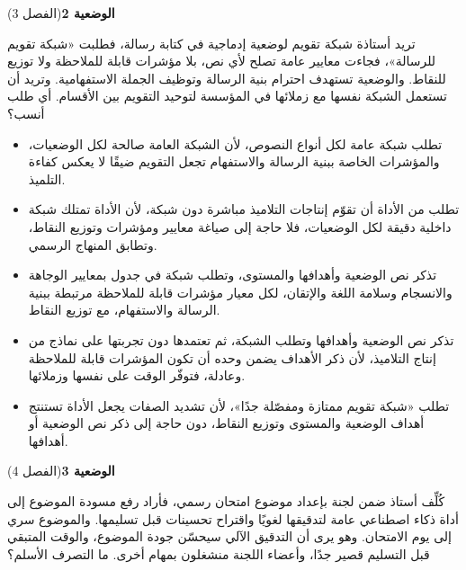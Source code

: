 \documentclass[11pt,a4paper]{article}
\begin{document}
\par\vspace{6pt}
\noindent
{\large\khatt\textbf{الوضعية 2}}\hfill{\small(الفصل 3)}\par\nopagebreak\vspace{3pt}
\setlength{\fboxsep}{7pt}\colorbox{gray!10}{\parbox{\dimexpr\linewidth-14pt}{تريد أستاذة شبكة تقويم لوضعية إدماجية في كتابة رسالة، فطلبت «شبكة تقويم للرسالة»، فجاءت معايير عامة تصلح لأي نص، بلا مؤشرات قابلة للملاحظة ولا توزيع للنقاط. والوضعية تستهدف احترام بنية الرسالة وتوظيف الجملة الاستفهامية. وتريد أن تستعمل الشبكة نفسها مع زملائها في المؤسسة لتوحيد التقويم بين الأقسام. أي طلب أنسب؟}}\par\nopagebreak
\begin{itemize}[leftmargin=1.0cm, labelsep=6pt, itemsep=3pt, topsep=4pt, parsep=0pt]
  \item[\textbf{أ)}] تطلب شبكة عامة لكل أنواع النصوص، لأن الشبكة العامة صالحة لكل الوضعيات، والمؤشرات الخاصة ببنية الرسالة والاستفهام تجعل التقويم ضيقًا لا يعكس كفاءة التلميذ.
  \item[\textbf{ب)}] تطلب من الأداة أن تقوّم إنتاجات التلاميذ مباشرة دون شبكة، لأن الأداة تمتلك شبكة داخلية دقيقة لكل الوضعيات، فلا حاجة إلى صياغة معايير ومؤشرات وتوزيع النقاط، وتطابق المنهاج الرسمي.
  \item[\textbf{ج)}] تذكر نص الوضعية وأهدافها والمستوى، وتطلب شبكة في جدول بمعايير الوجاهة والانسجام وسلامة اللغة والإتقان، لكل معيار مؤشرات قابلة للملاحظة مرتبطة ببنية الرسالة والاستفهام، مع توزيع النقاط.
  \item[\textbf{د)}] تذكر نص الوضعية وأهدافها وتطلب الشبكة، ثم تعتمدها دون تجربتها على نماذج من إنتاج التلاميذ، لأن ذكر الأهداف يضمن وحده أن تكون المؤشرات قابلة للملاحظة وعادلة، فتوفّر الوقت على نفسها وزملائها.
  \item[\textbf{هـ)}] تطلب «شبكة تقويم ممتازة ومفصّلة جدًا»، لأن تشديد الصفات يجعل الأداة تستنتج أهداف الوضعية والمستوى وتوزيع النقاط، دون حاجة إلى ذكر نص الوضعية أو أهدافها.
\end{itemize}
\par\vspace{6pt}
\noindent
{\large\khatt\textbf{الوضعية 3}}\hfill{\small(الفصل 4)}\par\nopagebreak\vspace{3pt}
\setlength{\fboxsep}{7pt}\colorbox{gray!10}{\parbox{\dimexpr\linewidth-14pt}{كُلِّف أستاذ ضمن لجنة بإعداد موضوع امتحان رسمي، فأراد رفع مسودة الموضوع إلى أداة ذكاء اصطناعي عامة لتدقيقها لغويًا واقتراح تحسينات قبل تسليمها. والموضوع سري إلى يوم الامتحان. وهو يرى أن التدقيق الآلي سيحسّن جودة الموضوع، والوقت المتبقي قبل التسليم قصير جدًا، وأعضاء اللجنة منشغلون بمهام أخرى. ما التصرف الأسلم؟}}\par\nopagebreak
\end{document}

